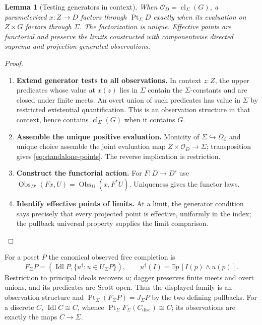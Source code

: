 \documentclass[11pt,a4paper]{article}
\numberwithin{algorithm}{section}
\numberwithin{equation}{section}
\newtheorem{lemma}[lemma]{Lemma}
\theoremstyle{definition}
\theoremstyle{remark}
\theoremstyle{plain}
\newcommand{\E}{\mathcal E}
\newcommand{\Truth}{\Omega_{\E}}
\newcommand{\OO}{\mathcal O}
\newcommand{\Idl}{\operatorname{Idl}}
\newcommand{\Pt}{\operatorname{Pt}_{\Sigma}}
\newcommand{\J}{J_{\Sigma}}
\newcommand{\F}{F_{\Sigma}}
\newcommand{\incl}{\hookrightarrow}
\newcommand{\cl}{\operatorname{cl}}
\theoremstyle{definition}
\theoremstyle{plain}
\begin{document}
\begin{lemma}[Testing generators in context]\label{lem:standalone-tests}
When $\OO_D=\cl_\Sigma(G)$, a parameterized $x:Z\to D$ factors
through $\Pt D$ exactly when its evaluation on $Z\times G$
factors through $\Sigma$. The factorization is unique.
Effective points are functorial and preserve the limits constructed
with componentwise directed suprema and projection-generated observations.
\end{lemma}
\begin{proof}\leavevmode
\begin{enumerate}[leftmargin=*,align=left]
\item \textbf{Extend generator tests to all observations.}
In context $z:Z$, the upper predicates whose value at $x(z)$
lies in $\Sigma$ contain the $\Sigma$-constants and are closed
under finite meets. An overt union of such predicates has value
in $\Sigma$ by restricted existential quantification. This is
an observation structure in that context, hence contains
$\cl_\Sigma(G)$ when it contains $G$.

\item \textbf{Assemble the unique positive evaluation.}
Monicity of $\Sigma\incl\Truth$
and unique choice assemble the joint evaluation map
$Z\times\OO_D\to\Sigma$; transposition gives
\eqref{eq:standalone-points}. The reverse implication is restriction.

\item \textbf{Construct the functorial action.}
For $F:D\to D'$ use
$\operatorname{Obs}_{D'}(F x,U)=\operatorname{Obs}_D(x,F^*U)$.
Uniqueness gives the functor laws.

\item \textbf{Identify effective points of limits.}
At a limit, the generator
condition says precisely that every projected point is effective,
uniformly in the index; the pullback universal property supplies
the limit comparison.
\end{enumerate}
\end{proof}

For a poset $P$ the canonical observed free completion is
\[
 \F P=(\Idl P,\{u^\dagger:u\in U_\Sigma P\}),\qquad
 u^\dagger(I)=\exists p\,[I(p)\wedge u(p)].
\]
Restriction to principal ideals recovers $u$; dagger preserves finite
meets and overt unions, and its predicates are Scott open.
Thus the displayed family is an observation structure and
$\Pt(\F P)=\J P$ by the two defining pullbacks.
For a discrete $C$, $\Idl C\cong C$, whence
$\Pt\F(C_{\mathrm{disc}})\cong C$; its observations are exactly
the maps $C\to\Sigma$.
\end{document}
